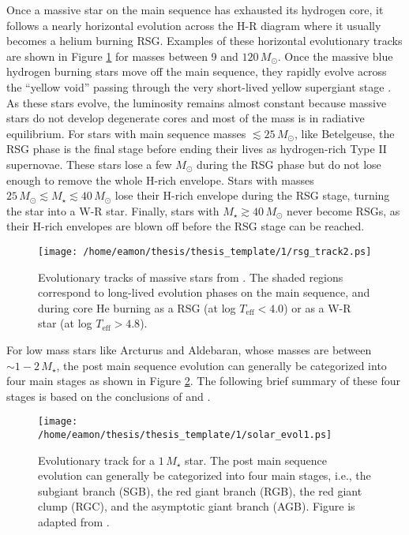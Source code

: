 Once a massive star on the main sequence has exhausted its  hydrogen core, it follows a nearly horizontal evolution across the H-R diagram where it usually becomes a helium burning RSG. Examples of these horizontal evolutionary tracks are shown in Figure \ref{fig:1.5.2.1} for masses between 9 and $120\,M_{\odot}$. Once the massive blue hydrogen burning stars move off the main sequence, they rapidly evolve across the ``yellow void'' passing through the very short-lived yellow supergiant stage \citep{levesque_2010}. As these stars evolve, the luminosity remains almost constant because massive stars do not develop degenerate cores and most of the mass is in radiative equilibrium. For stars with main sequence masses $\lesssim 25\,M_{\odot}$, like Betelgeuse, the RSG phase is the final stage before ending their lives as hydrogen-rich Type II supernovae. These stars lose a few $M_{\odot}$ during the RSG phase but do not lose enough to remove the whole H-rich envelope. Stars with masses $25\,M_{\odot}\lesssim M_{\star} \lesssim 40\,M_{\odot}$ lose their H-rich envelope during the RSG stage, turning the star into a W-R star. Finally, stars with $M_{\star} \gtrsim 40\,M_{\odot}$ never become RSGs, as their H-rich envelopes are blown off before the RSG stage can be reached.

\begin{figure}[t!]
\centering 
          \texttt{[image: /home/eamon/thesis/thesis\_template/1/rsg\_track2.ps]}
\caption[Evolutionary tracks of massive stars]{Evolutionary tracks of massive stars from \cite{maeder_1987}. The shaded regions correspond to long-lived evolution phases on the main sequence, and during core He burning as a RSG (at log $T_{\mathrm{eff}} < 4.0$) or as a W-R star (at log $T_{\mathrm{eff}} > 4.8$).}
\label{fig:1.5.2.1}
\end{figure}

For low mass stars like Arcturus and Aldebaran, whose masses are between $\sim 1-2\,M_{\star}$, the post main sequence evolution can generally be categorized into four main stages as shown in Figure \ref{fig:1.5.2.2}. The following brief summary of these four stages is based on the conclusions of \cite{iben_1967} and \cite{ryan_2010}.

\begin{figure}[t!]
\centering 
    \texttt{[image: /home/eamon/thesis/thesis\_template/1/solar\_evol1.ps]}
\caption[Evolution track of a low mass star]{Evolutionary track for a $1\,M_{\star}$ star. The post main sequence evolution can generally be categorized into four main stages, i.e., the subgiant branch (SGB), the red giant branch (RGB), the red giant clump (RGC), and the asymptotic giant branch (AGB). Figure is adapted from \cite{ryan_2010}.}
\label{fig:1.5.2.2}
\end{figure}


